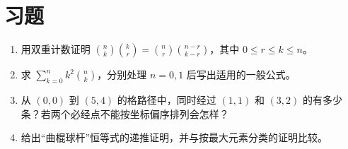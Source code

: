 \section{习题}
\begin{enumerate}
  \item\label{ex:identities-1} 用双重计数证明 $\binom nk\binom kr=\binom nr\binom{n-r}{k-r}$，其中 $0\le r\le k\le n$。
  \item\label{ex:identities-2} 求 $\sum_{k=0}^n k^2\binom nk$，分别处理 $n=0,1$ 后写出适用的一般公式。
  \item\label{ex:identities-3} 从 $(0,0)$ 到 $(5,4)$ 的格路径中，同时经过 $(1,1)$ 和 $(3,2)$ 的有多少条？若两个必经点不能按坐标偏序排列会怎样？
  \item\label{ex:identities-4} 给出“曲棍球杆”恒等式的递推证明，并与按最大元素分类的证明比较。
\end{enumerate}

